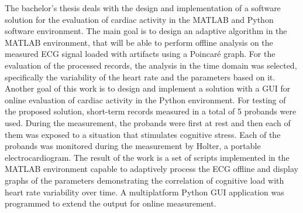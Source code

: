 The bachelor's thesis deals with the design and implementation of a software
solution for the evaluation of cardiac activity in the MATLAB and Python
software environment. The main goal is to design an adaptive algorithm in the
MATLAB environment, that will be able to perform offline analysis on the
measured ECG signal loaded with artifacts using a Poincaré graph. For the
evaluation of the processed records, the analysis in the time domain was
selected, specifically the variability of the heart rate and the parameters
based on it. Another goal of this work is to design and implement a solution
with a GUI for online evaluation of cardiac activity in the Python environment.
For testing of the proposed solution, short-term records measured in a total of
5 probands were used. During the measurement, the probands were first at rest
and then each of them was exposed to a situation that stimulates cognitive
stress. Each of the probands was monitored during the measurement by Holter, a
portable electrocardiogram. The result of the work is a set of scripts
implemented in the MATLAB environment capable to adaptively process the ECG
offline and display graphs of the parameters demonstrating the correlation of
cognitive load with heart rate variability over time. A multiplatform Python GUI
application was programmed to extend the output for online measurement. 